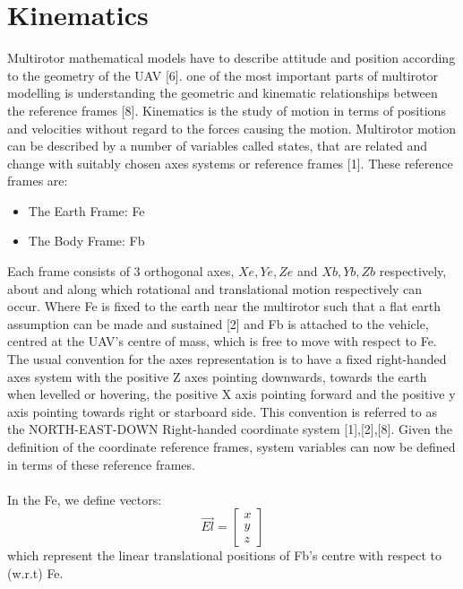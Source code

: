 \documentclass[12pt,a4paper,twoside]{report}
\begin{document}
		\section{Kinematics}
			
			Multirotor mathematical models have to describe attitude and position according to the geometry of the UAV [6]. one of the most important parts of multirotor modelling is understanding the geometric and kinematic relationships between the reference frames [8]. Kinematics is the study of motion in terms of positions and velocities without regard to the forces causing the motion. Multirotor motion can be described by a number of variables called states, that are related and change with suitably chosen axes systems or reference frames [1]. These reference frames are:
				
			\begin{itemize}
				\item
					The Earth Frame: Fe
				\item 
					The Body Frame: Fb  
			\end{itemize}
			\space
			Each frame consists of 3 orthogonal axes, \(Xe,Ye,Ze\) and \(Xb,Yb,Zb\) respectively, about and along which rotational and translational motion respectively can occur. Where Fe is fixed to the earth near the multirotor such that a flat earth assumption can be made and sustained [2] and Fb is attached to the vehicle, centred at the UAV’s centre of mass, which is free to move with respect to Fe. The usual convention for the axes representation is to have a fixed right-handed axes system with the positive Z axes pointing downwards, towards the earth when levelled or hovering, the positive X axis pointing forward and the positive y axis pointing towards right or starboard side. This convention is referred to as the NORTH-EAST-DOWN Right-handed coordinate system [1],[2],[8]. Given the definition of the coordinate reference frames, system variables can now be defined in terms of these reference frames.
			\\ \\
			In the Fe, we define vectors:
			\\
			\begin{equation}
			\vec{El} = 
			\begin{bmatrix}
				x \\
				y \\
				z
			\end{bmatrix}
			\end{equation}
			which represent the linear translational positions of Fb’s centre with respect to (w.r.t) Fe.
\end{document}
